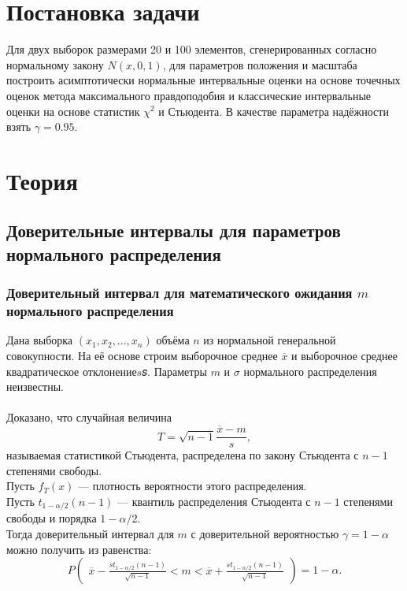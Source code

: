
\usepackage{amsmath}




\renewcommand\contentsname{\centerline{Содержание}}
\tableofcontents
\newpage

\listoftables
\newpage


\section{Постановка задачи}
Для двух выборок размерами 20 и 100 элементов, сгенерированных согласно нормальному закону $N(x, 0, 1)$, для параметров положения и масштаба построить асимптотически нормальные интервальные оценки на основе точечных оценок метода максимального правдоподобия и классические интервальные оценки на основе статистик $\chi^2$ и Стьюдента. В качестве параметра надёжности взять $\gamma=0.95$.


\section{Теория}

\subsection{Доверительные интервалы для параметров нормального распределения}

\subsubsection{Доверительный интервал для математического ожидания $m$ нормального распределения}
Дана выборка $(x_1, x_2, ... , x_n)$ объёма $n$ из нормальной генеральной совокупности. На её основе строим выборочное среднее $\overline{x}$ и выборочное среднее квадратическое отклонение$s$𝑠. Параметры $m$ и $\sigma$ нормального распределения неизвестны.\\
\\
Доказано, что случайная величина
\begin{equation}
T=\sqrt{n-1}\frac{\overline{x}-m}{s},
\end{equation}
называемая статистикой Стьюдента, распределена по закону Стьюдента с $n-1$ степенями свободы. \\
Пусть $f_T(x)$ — плотность вероятности этого распределения. \\
Пусть $t_{1-\alpha/2}(n-1)$ — квантиль распределения Стьюдента с $n-1$ степенями свободы и порядка $1-\alpha/2$. \\
Тогда доверительный интервал для $m$ с доверительной вероятностью $\gamma=1-\alpha$ можно получить из равенства:
\begin{equation}
P\begin{pmatrix}\overline{x}-\frac{st_{1-\alpha/2}(n-1)}{\sqrt{n-1}}<m<\overline{x}+\frac{st_{1-\alpha/2}(n-1)}{\sqrt{n-1}}\end{pmatrix}=1-\alpha.
\end{equation}

